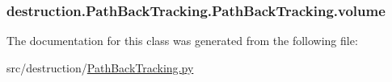 \hypertarget{classdestruction_1_1_path_back_tracking_1_1_path_back_tracking_ac87cd9b169c234775db8defbae19b911}{
\subsubsection[{volume}]{\setlength{\rightskip}{0pt plus 5cm}destruction.\-Path\-Back\-Tracking.\-Path\-Back\-Tracking.\-volume}}\label{classdestruction_1_1_path_back_tracking_1_1_path_back_tracking_ac87cd9b169c234775db8defbae19b911}


The documentation for this class was generated from the following file\-:\begin{DoxyCompactItemize}
\item 
src/destruction/\hyperlink{_path_back_tracking_8py}{Path\-Back\-Tracking.\-py}\end{DoxyCompactItemize}
